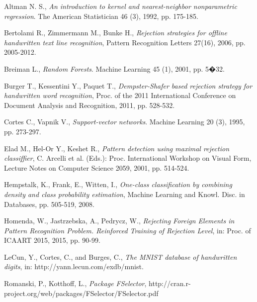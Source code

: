 \documentclass{llncs}
\begin{document}
\begin{thebibliography}{1}

Altman N. S., \emph{An introduction to kernel and nearest-neighbor nonparametric regression}. The American Statistician 46 (3), 1992, pp. 175-185.

Bertolami R., Zimmermann M., Bunke H., \emph{Rejection strategies for offline handwritten text line recognition}, Pattern Recognition Letters 27(16), 2006, pp. 2005-2012.

Breiman L., \emph{Random Forests}. Machine Learning 45 (1), 2001, pp. 5�32. 

Burger T., Kessentini Y., Paquet T., \emph{Dempster-Shafer based rejection strategy for handwritten word recognition}, Proc. of the 2011 International Conference on Document Analysis and Recognition, 2011, pp. 528-532.

Cortes C., Vapnik V., \emph{Support-vector networks}. Machine Learning 20 (3), 1995, pp. 273-297.
 
Elad M., Hel-Or Y., Keshet R., \emph{Pattern detection using maximal rejection classiffier}, C. Arcelli et al. (Eds.): Proc. International Workshop on Visual Form, Lecture Notes on Computer Science 2059, 2001, pp. 514-524.
 
Hempstalk, K., Frank, E., Witten, I., \emph{One-class classification by combining density and class probability estimation}, Machine Learning and Knowl. Disc. in Databases, pp. 505-519, 2008.

Homenda, W., Jastrzebska, A., Pedrycz, W., \emph{Rejecting Foreign Elements in Pattern Recognition Problem. Reinforced Training of Rejection Level}, in: Proc. of ICAART 2015, 2015, pp. 90-99.


LeCun, Y., Cortes, C., and Burges, C., \emph{The MNIST database of handwritten digits}, in: http://yann.lecun.com/exdb/mnist.

Romanski, P., Kotthoff, L., \emph{Package FSelector}, http://cran.r-project.org/web/packages/FSelector/FSelector.pdf


\end{thebibliography}
\end{document}
